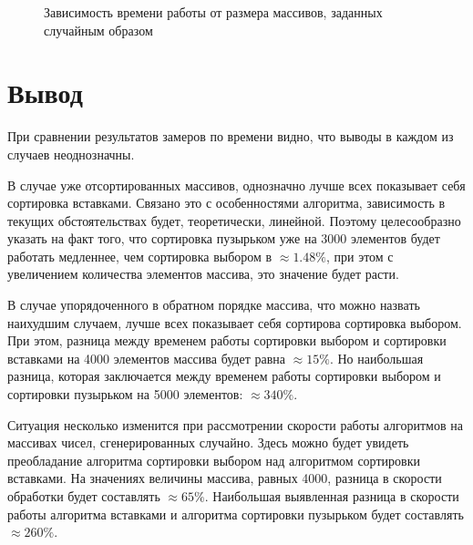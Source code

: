 \documentclass[12pt]{report}
\begin{document}
\begin{figure}[h]
\begin{center}
	\captionsetup{justification=centering}
	\caption{Зависимость времени работы от размера массивов, заданных случайным образом}
	\label{timeRes3}
	\end{center}
\end{figure}

\newpage

\section*{Вывод}
При сравнении результатов замеров по времени видно, что выводы в каждом из случаев неоднозначны.

В случае уже отсортированных массивов, однозначно лучше всех показывает себя сортировка вставками. Связано это с особенностями алгоритма, зависимость в текущих обстоятельствах будет, теоретически, линейной. Поэтому целесообразно указать на факт того, что сортировка пузырьком уже на 3000 элементов будет работать медленнее, чем сортировка выбором в  $\approx 1.48 \%$, при этом с увеличением количества элементов массива, это значение будет расти.

В случае упорядоченного в обратном порядке массива, что можно назвать наихудшим случаем, лучше всех показывает себя сортирова сортировка выбором. При этом, разница между временем работы сортировки выбором и сортировки вставками на 4000 элементов массива будет равна $\approx 15\%$. Но наибольшая разница, которая заключается между временем работы сортировки выбором и сортировки пузырьком на 5000 элементов: $\approx 340\%$.

Ситуация несколько изменится при рассмотрении скорости работы алгоритмов на массивах чисел, сгенерированных случайно. Здесь можно будет увидеть преобладание алгоритма сортировки выбором над алгоритмом сортировки вставками. На значениях величины массива, равных 4000, разница в скорости обработки будет составлять $\approx 65\%$. Наибольшая выявленная разница в скорости работы алгоритма вставками и алгоритма сортировки пузырьком будет составлять $\approx 260\%$.
\end{document}
